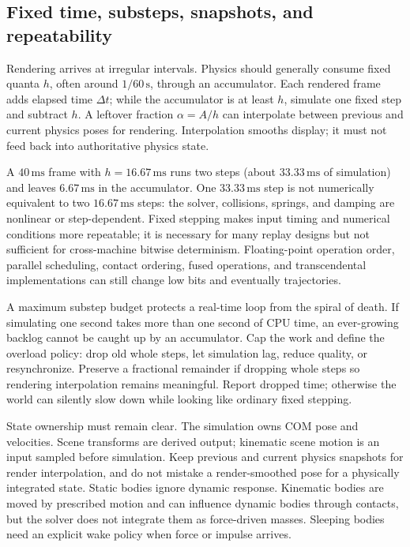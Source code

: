 \subsection{Fixed time, substeps, snapshots, and repeatability}\label{06-engine-ii-ch034-fixed-time-substeps-snapshots-and-repeatability}

\hypertarget{06-engine-ii-ch034-fixed-time-substeps-snapshots-and-repeatability}{}

Rendering arrives at irregular intervals. Physics should generally consume fixed quanta \(h\), often around \(1/60\,\mathrm s\), through an accumulator. Each rendered frame adds elapsed time \(\Delta t\); while the accumulator is at least \(h\), simulate one fixed step and subtract \(h\). A leftover fraction \(\alpha=A/h\) can interpolate between previous and current physics poses for rendering. Interpolation smooths display; it must not feed back into authoritative physics state.

A \(40\,\mathrm{ms}\) frame with \(h=16.67\,\mathrm{ms}\) runs two steps (about \(33.33\,\mathrm{ms}\) of simulation) and leaves \(6.67\,\mathrm{ms}\) in the accumulator. One \(33.33\,\mathrm{ms}\) step is not numerically equivalent to two \(16.67\,\mathrm{ms}\) steps: the solver, collisions, springs, and damping are nonlinear or step-dependent. Fixed stepping makes input timing and numerical conditions more repeatable; it is necessary for many replay designs but not sufficient for cross-machine bitwise determinism. Floating-point operation order, parallel scheduling, contact ordering, fused operations, and transcendental implementations can still change low bits and eventually trajectories.

A maximum substep budget protects a real-time loop from the spiral of death. If simulating one second takes more than one second of CPU time, an ever-growing backlog cannot be caught up by an accumulator. Cap the work and define the overload policy: drop old whole steps, let simulation lag, reduce quality, or resynchronize. Preserve a fractional remainder if dropping whole steps so rendering interpolation remains meaningful. Report dropped time; otherwise the world can silently slow down while looking like ordinary fixed stepping.

State ownership must remain clear. The simulation owns COM pose and velocities. Scene transforms are derived output; kinematic scene motion is an input sampled before simulation. Keep previous and current physics snapshots for render interpolation, and do not mistake a render-smoothed pose for a physically integrated state. Static bodies ignore dynamic response. Kinematic bodies are moved by prescribed motion and can influence dynamic bodies through contacts, but the solver does not integrate them as force-driven masses. Sleeping bodies need an explicit wake policy when force or impulse arrives.

